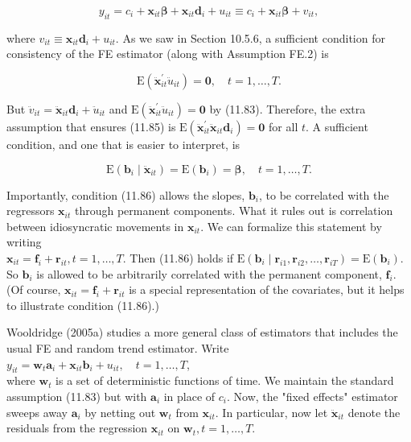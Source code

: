 \documentclass[10pt]{article}
\begin{document}
\begin{equation*}
y_{i t}=c_{i}+\mathbf{x}_{i t} \boldsymbol{\beta}+\mathbf{x}_{i t} \mathbf{d}_{i}+u_{i t} \equiv c_{i}+\mathbf{x}_{i t} \boldsymbol{\beta}+v_{i t}, \tag{11.84}
\end{equation*}


where $v_{i t} \equiv \mathbf{x}_{i t} \mathbf{d}_{i}+u_{i t}$. As we saw in Section 10.5.6, a sufficient condition for consistency of the FE estimator (along with Assumption FE.2) is


\begin{equation*}
\mathrm{E}\left(\ddot{\mathbf{x}}_{i t}^{\prime} \ddot{u}_{i t}\right)=\mathbf{0}, \quad t=1, \ldots, T . \tag{11.85}
\end{equation*}


But $\ddot{v}_{i t}=\ddot{\mathbf{x}}_{i t} \mathbf{d}_{i}+\ddot{u}_{i t}$ and $\mathrm{E}\left(\ddot{\mathbf{x}}_{i t}^{\prime} \ddot{u}_{i t}\right)=\mathbf{0}$ by (11.83). Therefore, the extra assumption that ensures (11.85) is $\mathrm{E}\left(\ddot{\mathbf{x}}_{i t}^{\prime} \ddot{\mathbf{x}}_{i t} \mathbf{d}_{i}\right)=\mathbf{0}$ for all $t$. A sufficient condition, and one that is easier to interpret, is


\begin{equation*}
\mathrm{E}\left(\mathbf{b}_{i} \mid \ddot{\mathbf{x}}_{i t}\right)=\mathrm{E}\left(\mathbf{b}_{i}\right)=\boldsymbol{\beta}, \quad t=1, \ldots, T . \tag{11.86}
\end{equation*}


Importantly, condition (11.86) allows the slopes, $\mathbf{b}_{i}$, to be correlated with the regressors $\mathbf{x}_{i t}$ through permanent components. What it rules out is correlation between idiosyncratic movements in $\mathbf{x}_{i t}$. We can formalize this statement by writing\\
$\mathbf{x}_{i t}=\mathbf{f}_{i}+\mathbf{r}_{i t}, t=1, \ldots, T$. Then (11.86) holds if $\mathrm{E}\left(\mathbf{b}_{i} \mid \mathbf{r}_{i 1}, \mathbf{r}_{i 2}, \ldots, \mathbf{r}_{i T}\right)=\mathrm{E}\left(\mathbf{b}_{i}\right)$. So $\mathbf{b}_{i}$ is allowed to be arbitrarily correlated with the permanent component, $\mathbf{f}_{i}$. (Of course, $\mathbf{x}_{i t}=\mathbf{f}_{i}+\mathbf{r}_{i t}$ is a special representation of the covariates, but it helps to illustrate condition (11.86).)

Wooldridge (2005a) studies a more general class of estimators that includes the usual FE and random trend estimator. Write\\
$y_{i t}=\mathbf{w}_{t} \mathbf{a}_{i}+\mathbf{x}_{i t} \mathbf{b}_{i}+u_{i t}, \quad t=1, \ldots, T$,\\
where $\mathbf{w}_{t}$ is a set of deterministic functions of time. We maintain the standard assumption (11.83) but with $\mathbf{a}_{i}$ in place of $c_{i}$. Now, the "fixed effects" estimator sweeps away $\mathbf{a}_{i}$ by netting out $\mathbf{w}_{t}$ from $\mathbf{x}_{i t}$. In particular, now let $\ddot{\mathbf{x}}_{i t}$ denote the residuals from the regression $\mathbf{x}_{i t}$ on $\mathbf{w}_{t}, t=1, \ldots, T$.
\end{document}
